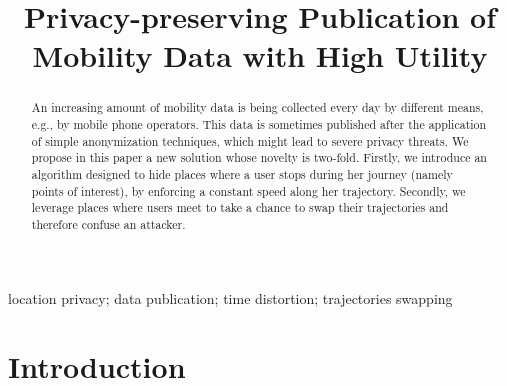 \documentclass[10,conference,compsocconf]{IEEEtran}
\begin{document}
\author{
}

\title{Privacy-preserving Publication of Mobility Data with High Utility}

\maketitle

\begin{abstract}
An increasing amount of mobility data is being collected every day by different means, e.g., by mobile phone operators.
This data is sometimes published after the application of simple anonymization techniques, which might lead to severe privacy threats.
We propose in this paper a new solution whose novelty is two-fold.
Firstly, we introduce an algorithm designed to hide places where a user stops during her journey (namely points of interest), by enforcing a constant speed along her trajectory.
Secondly, we leverage places where users meet to take a chance to swap their trajectories and therefore confuse an attacker.
\end{abstract}

\begin{IEEEkeywords}
location privacy; data publication; time distortion; trajectories swapping
\end{IEEEkeywords}

\section{Introduction}
\end{document}

